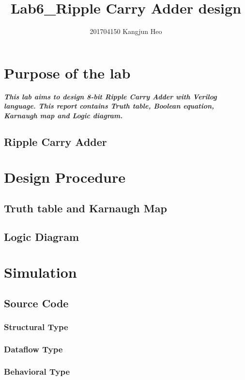\documentclass{report}
\title{Lab6\_Ripple Carry Adder design}
\author{201704150 Kangjun Heo}
\begin{document}
    \maketitle
    \tableofcontents

    \chapter{Purpose of the lab}

        \paragraph{This lab aims to design 8-bit Ripple Carry Adder with Verilog language. This report contains Truth table, Boolean equation, Karnaugh map and Logic diagram.}
    
        \section{Ripple Carry Adder}

    \chapter{Design Procedure}

        \section{Truth table and Karnaugh Map}

        \section{Logic Diagram}

    \chapter{Simulation}
        \section{Source Code}
            \subsection{Structural Type}
            \subsection{Dataflow Type}
            \subsection{Behavioral Type}
\end{document}
